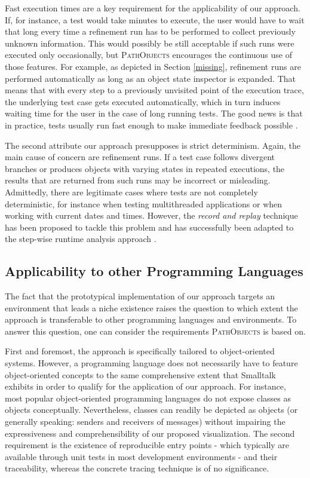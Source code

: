 Fast execution times are a key requirement for the applicability of our approach.
If, for instance, a test would take minutes to execute, the user would have to wait that long every time a refinement run has to be performed to collect previously unknown information.
This would possibly be still acceptable if such runs were executed only occasionally, but \textsc{PathObjects} encourages the continuous use of those features.
For example, as depicted in Section \ref{missing}, refinement runs are performed automatically as long as an object state inspector is expanded.
That means that with every step to a previously unvisited point of the execution trace, the underlying test case gets executed automatically, which in turn induces waiting time for the user in the case of long running tests. The good news is that in practice, tests usually run fast enough to make immediate feedback possible \cite{perscheid_immediacy_2010}.

The second attribute our approach presupposes is strict determinism.
Again, the main cause of concern are refinement runs.
If a test case follows divergent branches or produces objects with varying states in repeated executions, the results that are returned from such runs may be incorrect or misleading.
Admittedly, there are legitimate cases where tests are not completely deterministic, for instance when testing multithreaded applications or when working with current dates and times.
However, the \emph{record and replay} technique has been proposed to tackle this problem \cite{choi_deterministic_1998} and has successfully been adapted to the step-wise runtime analysis approach \cite{felgentreff_comparison_2012}.

\subsection{Applicability to other Programming Languages}
\label{ss:DiscussionApplicability}
The fact that the prototypical implementation of our approach targets an environment that leads a niche existence raises the question to which extent the approach is transferable to other programming languages and environments.
To answer this question, one can consider the requirements \textsc{PathObjects} is based on.

First and foremost, the approach is specifically tailored to object-oriented systems.
However, a programming language does not necessarily have to feature object-oriented concepts to the same comprehensive extent that Smalltalk exhibits in order to qualify for the application of our approach.
For instance, most popular object-oriented programming languages do not expose classes as objects conceptually. 
Nevertheless, classes can readily be depicted as objects (or generally speaking: senders and receivers of messages) without impairing the expressiveness and comprehensibility of our proposed visualization.
The second requirement is the existence of reproducible entry points - which typically are available through unit tests in most development environments - and their traceability, whereas the concrete tracing technique is of no significance.

